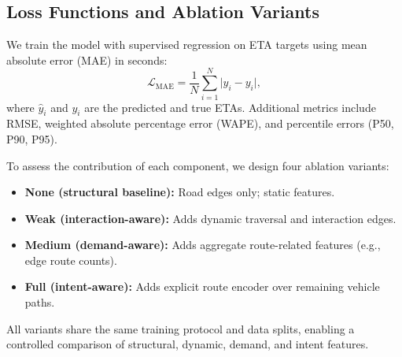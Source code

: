     

\subsection{Loss Functions and Ablation Variants}
We train the model with supervised regression on ETA targets using mean absolute error (MAE) in seconds:
\[
\mathcal{L}_{\text{MAE}} = \frac{1}{N}\sum_{i=1}^N \big| \hat{y}_i - y_i \big|,
\]
where $\hat{y}_i$ and $y_i$ are the predicted and true ETAs. Additional metrics include RMSE, weighted absolute percentage error (WAPE), and percentile errors (P50, P90, P95).

To assess the contribution of each component, we design four ablation variants:
\begin{itemize}
    \item \textbf{None (structural baseline):} Road edges only; static features.
    \item \textbf{Weak (interaction-aware):} Adds dynamic traversal and interaction edges.
    \item \textbf{Medium (demand-aware):} Adds aggregate route-related features (e.g., edge route counts).
    \item \textbf{Full (intent-aware):} Adds explicit route encoder over remaining vehicle paths.
\end{itemize}
All variants share the same training protocol and data splits, enabling a controlled comparison of structural, dynamic, demand, and intent features.
